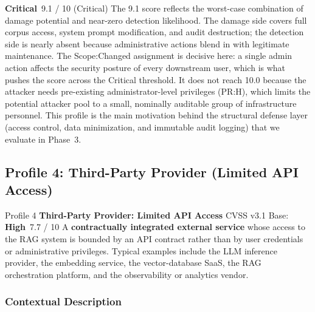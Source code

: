 \documentclass[12pt,a4paper]{report}
\newcommand{\badgecritical}{\colorbox{gray!15}{\footnotesize\textbf{Critical}}}
\newcommand{\badgehigh}{\colorbox{gray!15}{\footnotesize\textbf{High}}}
\begin{document}
\begin{cvssbox}{\badgecritical\ 9.1 / 10 (Critical)}
\small The 9.1 score reflects the worst-case combination of damage
potential and near-zero detection likelihood. The damage side covers
full corpus access, system prompt modification, and audit destruction;
the detection side is nearly absent because administrative actions
blend in with legitimate maintenance. The Scope:Changed assignment is
decisive here: a single admin action affects the security posture of
every downstream user, which is what pushes the score across the
Critical threshold. It does not reach 10.0 because the attacker needs
pre-existing administrator-level privileges (PR:H), which limits the
potential attacker pool to a small, nominally auditable group of
infrastructure personnel. This profile is the main motivation behind
the structural defense layer (access control, data minimization, and
immutable audit logging) that we evaluate in Phase~3.
\end{cvssbox}


\newpage
\subsection{Profile 4: Third-Party Provider (Limited API Access)}

\begin{profilebanner}%
  {Profile 4 \enspace\textbf{Third-Party Provider: Limited API Access}}%
  {CVSS v3.1 Base: \badgehigh\ 7.7 / 10}
  \small
  A \textbf{contractually integrated external service} whose access to the
  RAG system is bounded by an API contract rather than by user credentials
  or administrative privileges. Typical examples include the LLM inference
  provider, the embedding service, the vector-database SaaS, the RAG
  orchestration platform, and the observability or analytics vendor.
\end{profilebanner}

\subsubsection{Contextual Description}
\end{document}
